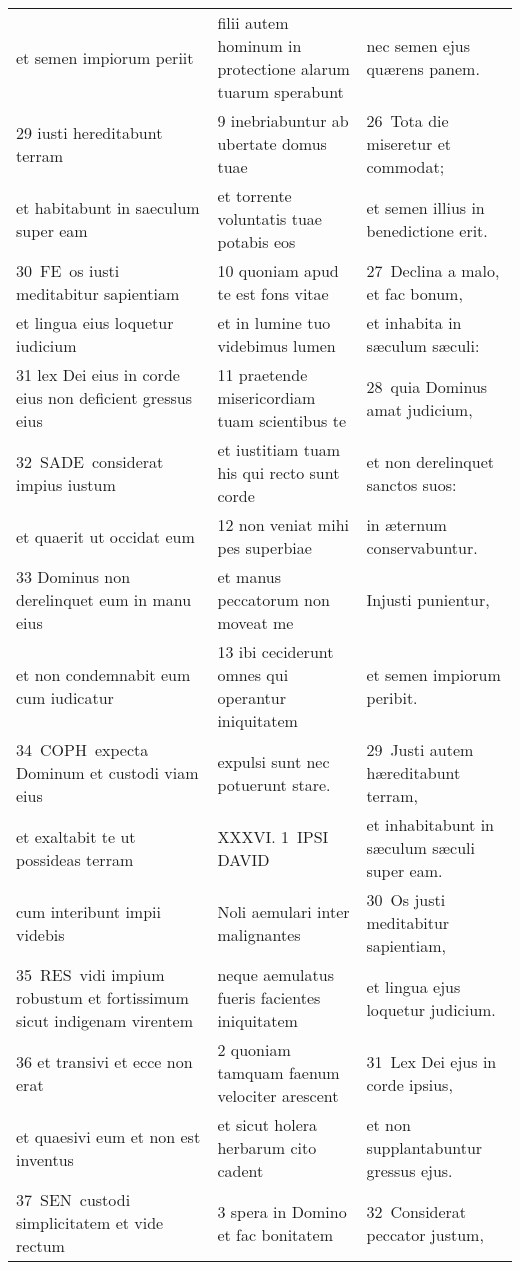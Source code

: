 \documentclass{article}
\begin{document}
\begin{longtable}{@{}p{}p{}p{}@{}}
et semen impiorum periit	&	filii autem hominum in protectione alarum tuarum sperabunt	&	nec semen ejus quærens panem.	\\
29 iusti hereditabunt terram	&	9 inebriabuntur ab ubertate domus tuae	&	26 Tota die miseretur et commodat;	\\
et habitabunt in saeculum super eam	&	et torrente voluntatis tuae potabis eos	&	et semen illius in benedictione erit.	\\
30 FE os iusti meditabitur sapientiam	&	10 quoniam apud te est fons vitae	&	27 Declina a malo, et fac bonum,	\\
et lingua eius loquetur iudicium	&	et in lumine tuo videbimus lumen	&	et inhabita in sæculum sæculi:	\\
31 lex Dei eius in corde eius non deficient gressus eius	&	11 praetende misericordiam tuam scientibus te	&	28 quia Dominus amat judicium,	\\
32 SADE considerat impius iustum	&	et iustitiam tuam his qui recto sunt corde	&	et non derelinquet sanctos suos:	\\
et quaerit ut occidat eum	&	12 non veniat mihi pes superbiae	&	in æternum conservabuntur.	\\
33 Dominus non derelinquet eum in manu eius	&	et manus peccatorum non moveat me	&	Injusti punientur,	\\
et non condemnabit eum cum iudicatur	&	13 ibi ceciderunt omnes qui operantur iniquitatem	&	et semen impiorum peribit.	\\
34 COPH expecta Dominum et custodi viam eius	&	expulsi sunt nec potuerunt stare.	&	29 Justi autem hæreditabunt terram,	\\
et exaltabit te ut possideas terram	&	XXXVI. 1 IPSI DAVID	&	et inhabitabunt in sæculum sæculi super eam.	\\
cum interibunt impii videbis	&	Noli aemulari inter malignantes	&	30 Os justi meditabitur sapientiam,	\\
35 RES vidi impium robustum et fortissimum sicut indigenam virentem	&	neque aemulatus fueris facientes iniquitatem	&	et lingua ejus loquetur judicium.	\\
36 et transivi et ecce non erat	&	2 quoniam tamquam faenum velociter arescent	&	31 Lex Dei ejus in corde ipsius,	\\
et quaesivi eum et non est inventus	&	et sicut holera herbarum cito cadent	&	et non supplantabuntur gressus ejus.	\\
37 SEN custodi simplicitatem et vide rectum	&	3 spera in Domino et fac bonitatem	&	32 Considerat peccator justum,	\\

\end{longtable}
\end{document}
